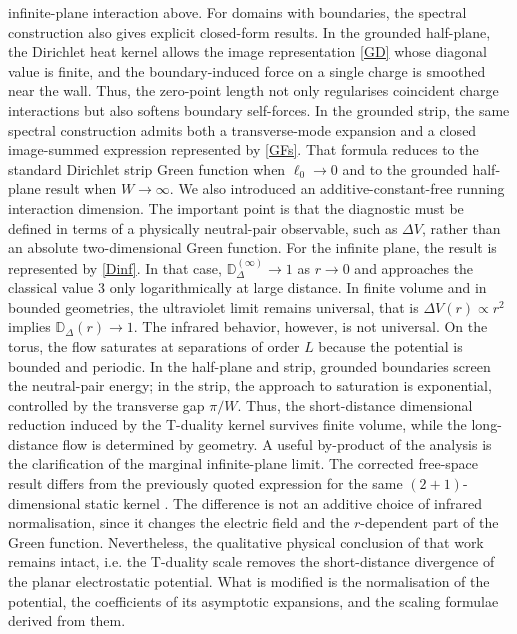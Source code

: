 \documentclass[openacc]{rsproca_new}%
\begin{document}
infinite-plane interaction above. For domains with boundaries, the spectral construction also gives explicit closed-form results. In the grounded half-plane, the Dirichlet heat kernel allows the image representation \eqref{GD} whose diagonal value is finite, and the boundary-induced force on a single charge is smoothed near the wall. Thus, the zero-point length not only regularises coincident charge interactions but also softens boundary self-forces. In the grounded strip, the same spectral construction admits both a transverse-mode expansion and a closed image-summed expression represented by \eqref{GFs}. That formula reduces to the standard Dirichlet strip Green function when $\ell_0\to 0$ and to the grounded half-plane result when $W\to\infty$. We also introduced an additive-constant-free running interaction dimension. The important point is that the diagnostic must be defined in terms of a physically neutral-pair observable, such as $\Delta V$, rather than an absolute two-dimensional Green function. For the infinite plane, the result is represented by \eqref{Dinf}. In that case, $\mathbb D_\Delta^{(\infty)}\to 1$ as $r\to 0$ and approaches the classical value $3$ only logarithmically at large distance. In finite volume and in bounded geometries, the ultraviolet limit remains universal, that is $\Delta V(r)\propto r^2$ implies $\mathbb D_\Delta(r)\to 1$. The infrared behavior, however, is not universal. On the torus, the flow saturates at separations of order $L$ because the potential is bounded and periodic. In the half-plane and strip, grounded boundaries screen the neutral-pair energy; in the strip, the approach to saturation is exponential, controlled by the transverse gap $\pi/W$. Thus, the short-distance dimensional reduction induced by the T-duality kernel survives finite volume, while the long-distance flow is determined by geometry. A useful by-product of the analysis is the clarification of the marginal infinite-plane limit. The corrected free-space result differs from the previously quoted expression for the same $(2+1)$-dimensional static kernel \cite{GaeteNicolini2026}. The difference is not an additive choice of infrared normalisation, since it changes the electric field and the $r$-dependent part of the Green function. Nevertheless, the qualitative physical conclusion of that work remains intact, i.e. the T-duality scale removes the short-distance divergence of the planar electrostatic potential. What is modified is the normalisation of the potential, the coefficients of its asymptotic expansions, and the scaling formulae derived from them.
\end{document}
